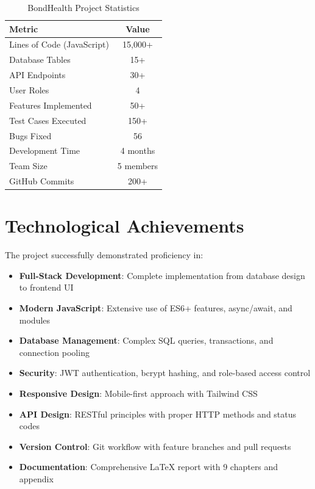 \begin{table}[H]
    \centering
    \begin{tabular}{|l|c|}
        \hline
        \textbf{Metric} & \textbf{Value} \\
        \hline
        Lines of Code (JavaScript) & 15,000+ \\
        \hline
        Database Tables & 15+ \\
        \hline
        API Endpoints & 30+ \\
        \hline
        User Roles & 4 \\
        \hline
        Features Implemented & 50+ \\
        \hline
        Test Cases Executed & 150+ \\
        \hline
        Bugs Fixed & 56 \\
        \hline
        Development Time & 4 months \\
        \hline
        Team Size & 5 members \\
        \hline
        GitHub Commits & 200+ \\
        \hline
    \end{tabular}
    \caption{BondHealth Project Statistics}
    \label{tab:stats}
\end{table}

\section{Technological Achievements}
The project successfully demonstrated proficiency in:

\begin{itemize}
    \item \textbf{Full-Stack Development}: Complete implementation from database design to frontend UI
    \item \textbf{Modern JavaScript}: Extensive use of ES6+ features, async/await, and modules
    \item \textbf{Database Management}: Complex SQL queries, transactions, and connection pooling
    \item \textbf{Security}: JWT authentication, bcrypt hashing, and role-based access control
    \item \textbf{Responsive Design}: Mobile-first approach with Tailwind CSS
    \item \textbf{API Design}: RESTful principles with proper HTTP methods and status codes
    \item \textbf{Version Control}: Git workflow with feature branches and pull requests
    \item \textbf{Documentation}: Comprehensive LaTeX report with 9 chapters and appendix
\end{itemize}

